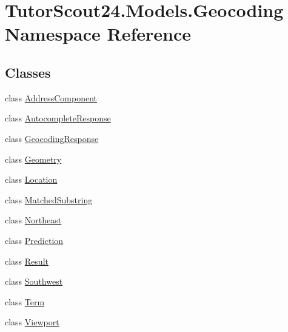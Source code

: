 \hypertarget{namespace_tutor_scout24_1_1_models_1_1_geocoding}{}\section{Tutor\+Scout24.\+Models.\+Geocoding Namespace Reference}
\label{namespace_tutor_scout24_1_1_models_1_1_geocoding}
\subsection*{Classes}
\begin{DoxyCompactItemize}
\item 
class \mbox{\hyperlink{class_tutor_scout24_1_1_models_1_1_geocoding_1_1_address_component}{Address\+Component}}
\item 
class \mbox{\hyperlink{class_tutor_scout24_1_1_models_1_1_geocoding_1_1_autocomplete_response}{Autocomplete\+Response}}
\item 
class \mbox{\hyperlink{class_tutor_scout24_1_1_models_1_1_geocoding_1_1_geocoding_response}{Geocoding\+Response}}
\item 
class \mbox{\hyperlink{class_tutor_scout24_1_1_models_1_1_geocoding_1_1_geometry}{Geometry}}
\item 
class \mbox{\hyperlink{class_tutor_scout24_1_1_models_1_1_geocoding_1_1_location}{Location}}
\item 
class \mbox{\hyperlink{class_tutor_scout24_1_1_models_1_1_geocoding_1_1_matched_substring}{Matched\+Substring}}
\item 
class \mbox{\hyperlink{class_tutor_scout24_1_1_models_1_1_geocoding_1_1_northeast}{Northeast}}
\item 
class \mbox{\hyperlink{class_tutor_scout24_1_1_models_1_1_geocoding_1_1_prediction}{Prediction}}
\item 
class \mbox{\hyperlink{class_tutor_scout24_1_1_models_1_1_geocoding_1_1_result}{Result}}
\item 
class \mbox{\hyperlink{class_tutor_scout24_1_1_models_1_1_geocoding_1_1_southwest}{Southwest}}
\item 
class \mbox{\hyperlink{class_tutor_scout24_1_1_models_1_1_geocoding_1_1_term}{Term}}
\item 
class \mbox{\hyperlink{class_tutor_scout24_1_1_models_1_1_geocoding_1_1_viewport}{Viewport}}
\end{DoxyCompactItemize}
